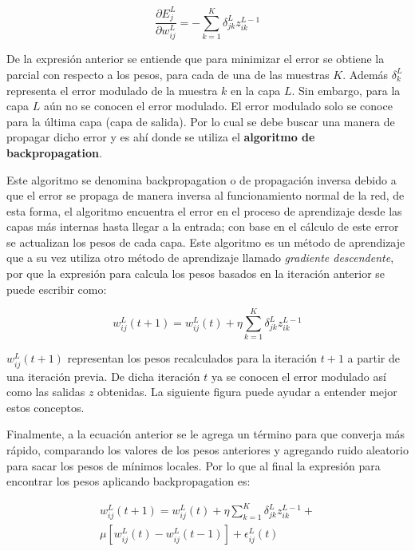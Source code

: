 \documentclass[12pt]{article}
\begin{document}
  \[
    \dfrac{\partial E_{j}^{L}}{\partial w_{ij}^{L}} = 
    -\sum_{k=1}^{K} \delta_{jk}^{L} z_{ik}^{L-1}
  \]

  De la expresión anterior se entiende que para minimizar el error se obtiene la
  parcial con respecto a los pesos, para cada de una de las muestras $K$. Además
  $\delta_{k}^{L}$ representa el error modulado de la muestra $k$ en la capa
  $L$.  Sin embargo, para la capa $L$ aún no se conocen el error modulado. El
  error modulado solo se conoce para la última capa (capa de salida). Por lo
  cual se debe buscar una manera de propagar dicho error y es ahí donde se
  utiliza el \textbf{algoritmo de backpropagation}.

  Este algoritmo se denomina backpropagation o de propagación inversa debido a
  que el error se propaga de manera inversa al funcionamiento normal de la red,
  de esta forma, el algoritmo encuentra el error en el proceso de aprendizaje
  desde las capas más internas hasta llegar a la entrada; con base en el cálculo
  de este error se actualizan los pesos de cada capa.
  Este algoritmo es un método de aprendizaje que a su vez utiliza otro método de
  aprendizaje llamado \textit{gradiente descendente}, por que la expresión para
  calcula los pesos basados en la iteración anterior se puede escribir como:

  \[
    w_{ij}^{L}(t+1) = w_{ij}^{L}(t) + \eta
    \sum_{k=1}^{K}\delta_{jk}^{L}z_{ik}^{L-1}
  \]

  $w_{ij}^{L}(t+1)$ representan los pesos recalculados para la iteración $t + 1$
  a partir de una iteración previa. De dicha iteración $t$ ya se conocen el
  error modulado así como las salidas $z$ obtenidas. La siguiente figura puede
  ayudar a entender mejor estos conceptos.

  \begin{center}
  \end{center}

  Finalmente, a la ecuación anterior se le agrega un término para que converja
  más rápido, comparando los valores de los pesos anteriores y agregando ruido
  aleatorio para sacar los pesos de mínimos locales. Por lo que al final la
  expresión para encontrar los pesos aplicando backpropagation es:

  \begin{equation*}
  \begin{split}
    w_{ij}^{L}(t+1) = w_{ij}^{L}(t) + \eta
    \sum_{k=1}^{K}\delta_{jk}^{L}z_{ik}^{L-1} + \\
    \mu[w_{ij}^{L}(t) - w_{ij}^{L}(t-1)] + \epsilon_{ij}^{L}(t)
  \end{split}
  \end{equation*}
\end{document}
